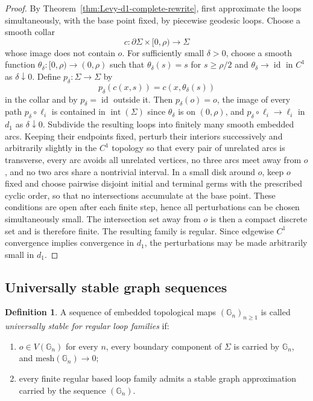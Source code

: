 \documentclass[11pt,a4paper,reqno]{article}
\theoremstyle{definition}
\newtheorem{definition}[theorem]{Definition}
\theoremstyle{remark}
\newcommand\Gbb{{\mathbb{G}}}
\newcommand\mesh{{\mathrm{mesh}}}
\begin{document}
\begin{proof}
By Theorem~\ref{thm:Levy-d1-complete-rewrite}, first approximate the loops simultaneously, with the base point fixed, by piecewise geodesic loops. Choose a smooth collar
\[
 c:\partial\Sigma\times[0,\rho)\longrightarrow\Sigma
\]
whose image does not contain $o$. For sufficiently small $\delta>0$, choose a smooth function $\theta_\delta:[0,\rho)\to(0,\rho)$ such that $\theta_\delta(s)=s$ for $s\ge\rho/2$ and $\theta_\delta\to\operatorname{id}$ in $C^1$ as $\delta\downarrow0$. Define $p_\delta:\Sigma\to\Sigma$ by
\[
 p_\delta(c(x,s))=c(x,\theta_\delta(s))
\]
in the collar and by $p_\delta=\operatorname{id}$ outside it. Then $p_\delta(o)=o$, the image of every path $p_\delta\circ\ell_i$ is contained in $\operatorname{int}(\Sigma)$ since $\theta_\delta$ is on $(0,\rho)$, and $p_\delta\circ\ell_i\to\ell_i$ in $d_1$ as $\delta\downarrow0$.
Subdivide the resulting loops into finitely many smooth embedded arcs. Keeping their endpoints fixed, perturb their interiors successively and arbitrarily slightly in the $C^1$ topology so that every pair of unrelated arcs is transverse, every arc avoids all unrelated vertices, no three arcs meet away from $o$, and no two arcs share a nontrivial interval. In a small disk around $o$, keep $o$ fixed and choose pairwise disjoint initial and terminal germs with the prescribed cyclic order, so that no intersections accumulate at the base point. These conditions are open after each finite step, hence all perturbations can be chosen simultaneously small. The intersection set away from $o$ is then a compact discrete set and is therefore finite. The resulting family is regular. Since edgewise $C^1$ convergence implies convergence in $d_1$, the perturbations may be made arbitrarily small in $d_1$.
\end{proof}

\subsection{Universally stable graph sequences}
\label{subsec:universal-stable-graph-sequences}

\begin{definition}\label{def:universally-stable-graph-sequence}
A sequence of embedded topological maps $(\Gbb_n)_{n\geq1}$ is called \emph{universally stable for regular loop families} if:
\begin{enumerate}
\item $o\in V(\Gbb_n)$ for every $n$, every boundary component of $\Sigma$ is carried by $\Gbb_n$, and $\mesh(\Gbb_n)\to0$;
\item every finite regular based loop family admits a stable graph approximation carried by the sequence $(\Gbb_n)$.
\end{enumerate}
\end{definition}
\end{document}
